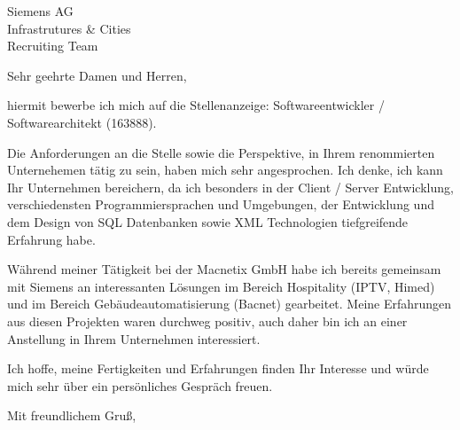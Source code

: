 \documentclass[
  fontsize=11pt,
  paper=a4,
  parskip=half,
  enlargefirstpage=on,    %
  fromalign=right,        %
  fromphone=on,           %
  fromrule=aftername,     %
  addrfield=on,           %
  backaddress=on,         %
  subject=beforeopening,  %
  locfield=narrow,        %
  foldmarks=on,           %
]{scrlttr2}
\begin{document}
  \begin{letter}{Siemens AG\\Infrastrutures \& Cities\\Recruiting Team}
    \opening{Sehr geehrte Damen und Herren,}
hiermit bewerbe ich mich auf die Stellenanzeige: Softwareentwickler / Softwarearchitekt (163888).

Die Anforderungen an die Stelle sowie die Perspektive, in Ihrem renommierten Unternehemen tätig zu sein, haben mich sehr angesprochen. Ich denke, ich kann Ihr Unternehmen bereichern, da ich besonders in der Client / Server Entwicklung, verschiedensten Programmiersprachen und Umgebungen, der Entwicklung und dem Design von SQL Datenbanken sowie XML Technologien tiefgreifende Erfahrung habe.

Während meiner Tätigkeit bei der Macnetix GmbH habe ich bereits gemeinsam mit Siemens an interessanten Lösungen im Bereich Hospitality (IPTV, Himed) und im Bereich Gebäudeautomatisierung (Bacnet) gearbeitet. Meine Erfahrungen aus diesen Projekten waren durchweg positiv, auch daher bin ich an einer Anstellung in Ihrem Unternehmen interessiert.

Ich hoffe, meine Fertigkeiten und Erfahrungen finden Ihr Interesse und würde mich sehr über ein persönliches Gespräch freuen.

    \closing{Mit freundlichem Gruß,}
  \end{letter}
\end{document}
